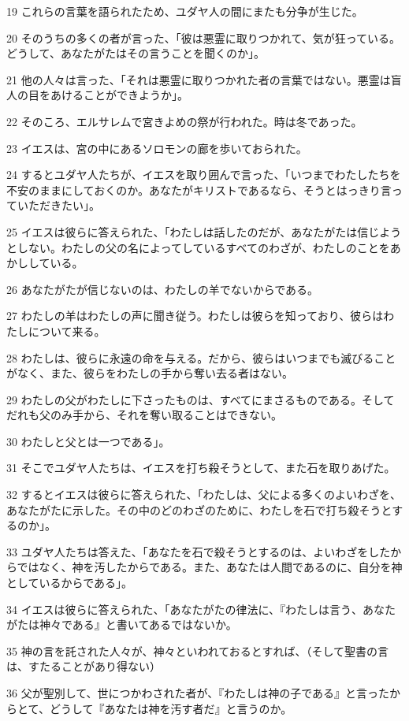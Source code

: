 \par 19 これらの言葉を語られたため、ユダヤ人の間にまたも分争が生じた。
\par 20 そのうちの多くの者が言った、「彼は悪霊に取りつかれて、気が狂っている。どうして、あなたがたはその言うことを聞くのか」。
\par 21 他の人々は言った、「それは悪霊に取りつかれた者の言葉ではない。悪霊は盲人の目をあけることができようか」。
\par 22 そのころ、エルサレムで宮きよめの祭が行われた。時は冬であった。
\par 23 イエスは、宮の中にあるソロモンの廊を歩いておられた。
\par 24 するとユダヤ人たちが、イエスを取り囲んで言った、「いつまでわたしたちを不安のままにしておくのか。あなたがキリストであるなら、そうとはっきり言っていただきたい」。
\par 25 イエスは彼らに答えられた、「わたしは話したのだが、あなたがたは信じようとしない。わたしの父の名によってしているすべてのわざが、わたしのことをあかししている。
\par 26 あなたがたが信じないのは、わたしの羊でないからである。
\par 27 わたしの羊はわたしの声に聞き従う。わたしは彼らを知っており、彼らはわたしについて来る。
\par 28 わたしは、彼らに永遠の命を与える。だから、彼らはいつまでも滅びることがなく、また、彼らをわたしの手から奪い去る者はない。
\par 29 わたしの父がわたしに下さったものは、すべてにまさるものである。そしてだれも父のみ手から、それを奪い取ることはできない。
\par 30 わたしと父とは一つである」。
\par 31 そこでユダヤ人たちは、イエスを打ち殺そうとして、また石を取りあげた。
\par 32 するとイエスは彼らに答えられた、「わたしは、父による多くのよいわざを、あなたがたに示した。その中のどのわざのために、わたしを石で打ち殺そうとするのか」。
\par 33 ユダヤ人たちは答えた、「あなたを石で殺そうとするのは、よいわざをしたからではなく、神を汚したからである。また、あなたは人間であるのに、自分を神としているからである」。
\par 34 イエスは彼らに答えられた、「あなたがたの律法に、『わたしは言う、あなたがたは神々である』と書いてあるではないか。
\par 35 神の言を託された人々が、神々といわれておるとすれば、（そして聖書の言は、すたることがあり得ない）
\par 36 父が聖別して、世につかわされた者が、『わたしは神の子である』と言ったからとて、どうして『あなたは神を汚す者だ』と言うのか。
